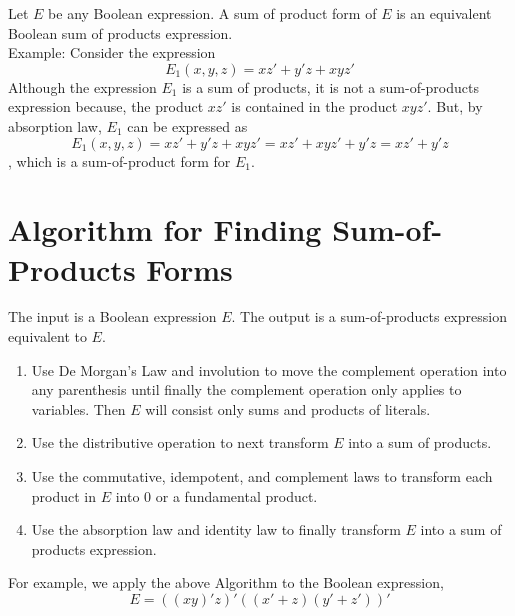 \documentclass[../main-sheet.tex]{subfiles}
\begin{document}
\begin{defn}
    Let $ E $ be any Boolean expression. A sum of product form of $ E $  is an equivalent Boolean sum of products expression.\\
    Example: Consider the expression
    \[
        E_1(x,y,z)=xz'+y'z+xyz'
    \]
    Although the expression $ E_1 $ is a sum of products, it is not a sum-of-products expression because, the product $ xz' $ is contained in the product $ xyz' $. But, by absorption law, $ E_1 $ can be expressed as
    \[
        E_1(x,y,z)=xz'+y'z+xyz'=xz'+xyz'+y'z=xz'+y'z
    \], 
    which is a sum-of-product form for $ E_1 $.
\end{defn}
\section{Algorithm for Finding Sum-of-Products Forms}
The input is a Boolean expression $ E $. The output is a sum-of-products expression equivalent to $ E $.
\begin{enumerate}[label=Step \arabic*.]
    \item Use De Morgan's Law and involution to move the complement operation into any parenthesis until finally the complement operation only applies to variables. Then $ E $ will consist only sums and products of literals.
    \item Use the distributive operation to next transform $ E $ into a sum of
    products.
    \item Use the commutative, idempotent, and complement laws to transform each product in $ E $ into 0 or a fundamental product.
    \item Use the absorption law and identity law to finally transform $ E $ into a sum of products expression.
\end{enumerate}
For example, we apply the above Algorithm to the Boolean expression,
\[
    E=((xy)'z)'((x'+z)(y'+z'))'
\]
\end{document}
